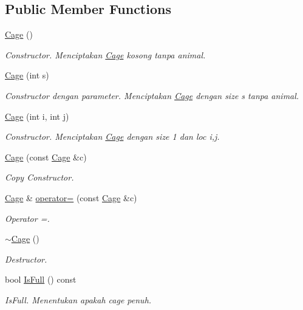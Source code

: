 \subsection*{Public Member Functions}
\begin{DoxyCompactItemize}
\item 
\hyperlink{classCage_ac03246dd263ee9fe6f37336317e62b69}{Cage} ()
\begin{DoxyCompactList}\small\item\em Constructor. Menciptakan \hyperlink{classCage}{Cage} kosong tanpa animal. \end{DoxyCompactList}\item 
\hyperlink{classCage_a8cd728b1eb23303888a153230f96490e}{Cage} (int s)
\begin{DoxyCompactList}\small\item\em Constructor dengan parameter. Menciptakan \hyperlink{classCage}{Cage} dengan size s tanpa animal. \end{DoxyCompactList}\item 
\hyperlink{classCage_a105ec044af346561cc7165f69da8cf08}{Cage} (int i, int j)
\begin{DoxyCompactList}\small\item\em Constructor. Menciptakan \hyperlink{classCage}{Cage} dengan size 1 dan loc i,j. \end{DoxyCompactList}\item 
\hyperlink{classCage_ae85bb53517616422bf7f36282de01519}{Cage} (const \hyperlink{classCage}{Cage} \&c)
\begin{DoxyCompactList}\small\item\em Copy Constructor. \end{DoxyCompactList}\item 
\hyperlink{classCage}{Cage} \& \hyperlink{classCage_a020eefd2b5d15915cf65693413be64db}{operator=} (const \hyperlink{classCage}{Cage} \&c)
\begin{DoxyCompactList}\small\item\em Operator =. \end{DoxyCompactList}\item 
\hyperlink{classCage_a657259499dfc23c63fc65aeaf8abbb17}{$\sim$\+Cage} ()
\begin{DoxyCompactList}\small\item\em Destructor. \end{DoxyCompactList}\item 
bool \hyperlink{classCage_af244dea5f1b3645d3f216a16f353ddc7}{Is\+Full} () const 
\begin{DoxyCompactList}\small\item\em Is\+Full. Menentukan apakah cage penuh. \end{DoxyCompactList}\item 

\end{DoxyCompactItemize}
